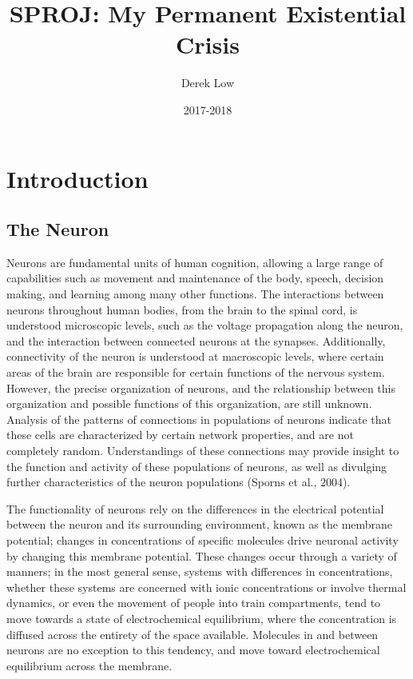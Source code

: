 \documentclass{article}
\title{SPROJ: My Permanent Existential Crisis}
\author{Derek Low}
\date{2017-2018}
\begin{document}
\maketitle

\section{Introduction}

\subsection{The Neuron}
Neurons are fundamental units of human cognition, allowing a large range of capabilities such as movement and maintenance of the body, speech, decision making, and learning among many other functions. The interactions between neurons throughout human bodies, from the brain to the spinal cord, is understood microscopic levels, such as the voltage propagation along the neuron, and the interaction between connected neurons at the synapses. Additionally, connectivity of the neuron is understood at macroscopic levels, where certain areas of the brain are responsible for certain functions of the nervous system. However, the precise organization of neurons, and the relationship between this organization and possible functions of this organization, are still unknown. Analysis of the patterns of connections in populations of neurons indicate that these cells are characterized by certain network properties, and are not completely random. Understandings of these connections may provide insight to the function and activity of these populations of neurons, as well as divulging further characteristics of the neuron populations (Sporns et al., 2004). \par

The functionality of neurons rely on the differences in the electrical potential between the neuron and its surrounding environment, known as the membrane potential; changes in concentrations of specific molecules drive neuronal activity by changing this membrane potential. These changes occur through a variety of manners; in the most general sense, systems with differences in concentrations, whether these systems are concerned with ionic concentrations or involve thermal dynamics, or even the movement of people into train compartments, tend to move towards a state of electrochemical equilibrium, where the concentration is diffused across the entirety of the space available. Molecules in and between neurons are no exception to this tendency, and move toward electrochemical equilibrium across the membrane.\par
\end{document}
